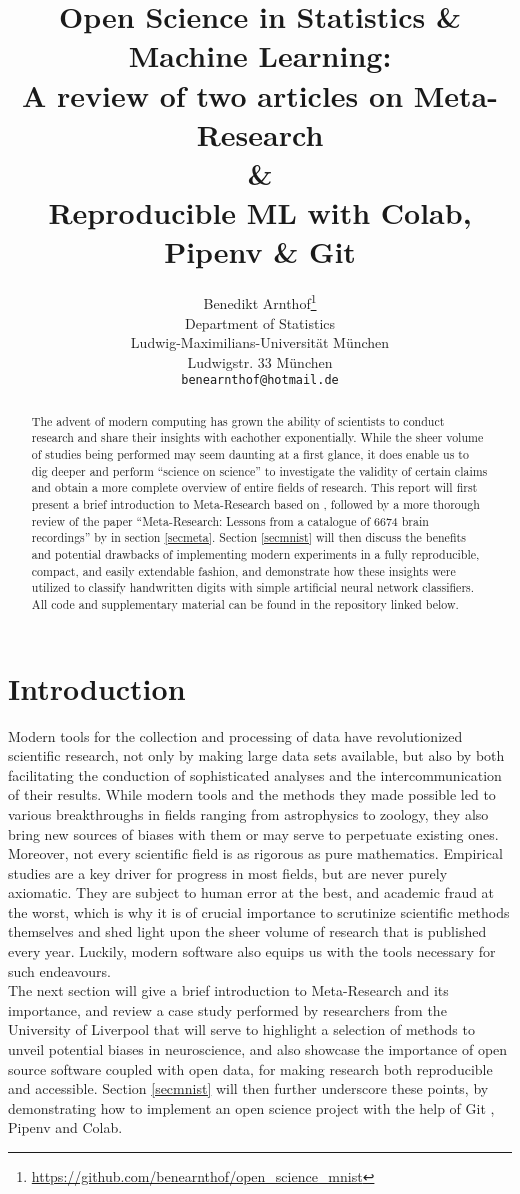 \documentclass{article}
\title{Open Science in Statistics \& Machine Learning:\\
A review of two articles on Meta-Research \\
\& \\
Reproducible ML with Colab, Pipenv \& Git}
\author{
  Benedikt Arnthof\thanks{\url{https://github.com/benearnthof/open_science_mnist}} \\
  Department of Statistics\\
  Ludwig-Maximilians-Universität München\\
  Ludwigstr. 33 München \\
  \texttt{benearnthof@hotmail.de} \\
}
\begin{document}
\renewcommand{\figurename}{Fig.}
\maketitle

\begin{abstract}
The advent of modern computing has grown the ability of scientists to conduct research and share their insights with eachother exponentially. While the sheer volume of studies being performed may seem daunting at a first glance, it does enable us to dig deeper and perform ``science on science'' to investigate the validity of certain claims and obtain a more complete overview of entire fields of research. This report will first present a brief introduction to Meta-Research based on \cite{metaresearch}, followed by a more thorough review of the paper ``Meta-Research: Lessons from a catalogue of 6674 brain recordings'' by \cite{brainrecordings} in section \ref{secmeta}. Section \ref{secmnist} will then discuss the benefits and potential drawbacks of implementing modern experiments in a fully reproducible, compact, and easily extendable fashion, and demonstrate how these insights were utilized to classify handwritten digits \cite{mnist} with simple artificial neural network classifiers. All code and supplementary material can be found in the repository linked below.
\end{abstract}

\section{Introduction}

Modern tools for the collection and processing of data have revolutionized scientific research, not only by making large data sets available, but also by both facilitating the conduction of sophisticated analyses and the intercommunication of their results. While modern tools and the methods they made possible led to various breakthroughs in fields ranging from astrophysics to zoology, they also bring new sources of biases with them or may serve to perpetuate existing ones. Moreover, not every scientific field is as rigorous as pure mathematics. Empirical studies are a key driver for progress in most fields, but are never purely axiomatic. They are subject to human error at the best, and academic fraud at the worst, which is why it is of crucial importance to scrutinize scientific methods themselves and shed light upon the sheer volume of research that is published every year. Luckily, modern software also equips us with the tools necessary for such endeavours.\\
The next section will give a brief introduction to Meta-Research and its importance, and review a case study performed by researchers from the University of Liverpool that will serve to highlight a selection of methods to unveil potential biases in neuroscience, and also showcase the importance of open source software coupled with open data, for making research both reproducible and accessible. Section \ref{secmnist} will then further underscore these points, by demonstrating how to implement an open science project with the help of Git \cite{git}, Pipenv \cite{pipenv} and Colab. \cite{colab}
\end{document}
